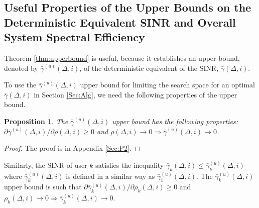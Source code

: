 \documentclass[conference, a4paper, 10pt]{IEEEtran}
\newcommand{\gf}[1]{\textcolor{cyan}{{#1}}}
\newtheorem{prop}{Proposition}
\newcommand{\bs}[1]{\boldsymbol{#1}}
\begin{document}

\subsection{Useful Properties of the Upper Bounds on the Deterministic Equivalent \ac{SINR} and Overall System Spectral Efficiency}

Theorem \ref{thm:upperbound} is useful, because it establishes an upper bound,
denoted by $\bar{\gamma}^{(u)}(\Delta, i)$,
of the deterministic equivalent of the \ac{SINR},
$\bar{\gamma}(\Delta, i)$.

To use the $\bar{\gamma}^{(u)}(\Delta, i)$ upper bound for limiting the search space for an optimal $\bar{\gamma}(\Delta, i)$ in Section \ref{Sec:Alg}, we need the following properties of the upper bound.



\begin{prop}
\label{UpperB1}
The $\bar{\gamma}^{(u)}(\Delta, i)$ upper bound has the following properties:
$\partial \bar{\gamma}^{(u)}(\Delta, i) / \partial \rho(\Delta, i) \geq 0$ and $\rho(\Delta, i) \rightarrow 0 \Rightarrow \bar{\gamma}^{(u)}(\Delta, i) \rightarrow 0$.
\end{prop}
\begin{proof}
The proof is in Appendix \ref{Sec:P2}.
\end{proof}

Similarly, the SINR of user $k$ satisfies the inequality
$\bar{\gamma}_k(\Delta, i) \leq \bar{\gamma}_k^{(u)}(\Delta, i)$
where $\bar{\gamma}_k^{(u)}(\Delta, i)$ is defined in a similar way as $\bar{\gamma}_1^{(u)}(\Delta, i)$.
The $\bar{\gamma}_k^{(u)}(\Delta, i)$ upper bound is such that
$\partial \bar{\gamma}_k^{(u)}(\Delta, i) / \partial \rho_k(\Delta, i) \geq 0$ and $\rho_k(\Delta, i) \rightarrow 0 \Rightarrow \bar{\gamma}_k^{(u)}(\Delta, i) \rightarrow 0$.
\end{document}
